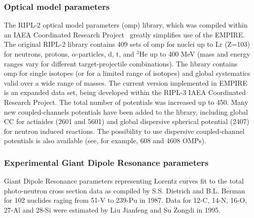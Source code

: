 \documentclass[twocolumn,amsmath,amssymb,10pt,groupedaddress,a4paper]{revtex4}
\begin{document}
\subsubsection{Optical model parameters\label{sec:RIPLomp}}
The RIPL-2 optical model parameters
(omp) library, which was compiled within an IAEA Coordinated Research
Project~\cite{RIPL2} greatly simplifies use of the EMPIRE. The original RIPL-2
library contains 409 sets of omp for nuclei
up to Lr (Z=103) for neutrons, protons, $\alpha$-particles, d, t,
and $^{3}$He up to 400 MeV (mass and energy ranges vary for different
target-projectile combinations). The library contains omp for single
isotopes (or for a limited range of isotopes) and global systematics
valid over a wide range of masses. The current version implemented in EMPIRE
is an expanded data set, being developed within the RIPL-3
IAEA Coordinated Research Project. The total number of potentials was
increased up to 450. Many new coupled-channels potentials have been added
to the library, including global CC for actinides (2601 and 5601) and
global dispersive spherical potential (2407) for neutron induced reactions.
The possibility to use dispersive coupled-channel potentials is also available
(see, for example, 608 and 4608 OMPs).

\subsubsection{Experimental Giant Dipole Resonance parameters}
Giant Dipole Resonance parameters representing Lorentz curves fit
to the total photo-neutron cross section data as compiled by S.S.
Dietrich and B.L. Berman \cite{die88} for 102 nuclides raging from
51-V to 239-Pu in 1987. Data for 12-C, 14-N, 16-O, 27-Al and 28-Si
were estimated by Liu Jianfeng and Su Zongdi in 1995.
\end{document}
